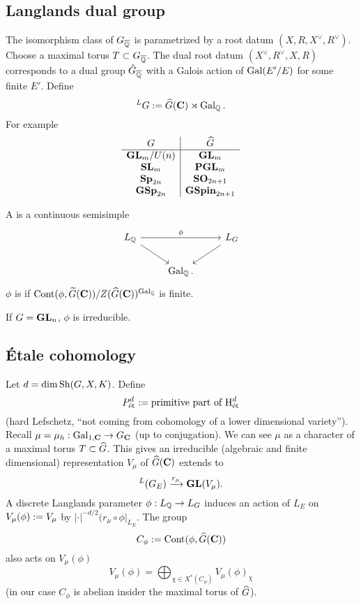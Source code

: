 \subsection{Langlands dual group}
The isomorphism class of $G_{\overline{\mathbb Q}}$ is parametrized by a root datum
$(X,R,X^{\vee},R^{\vee})$. Choose a maximal torus $T\subset G_{\overline{\mathbb Q}}$. The dual
root datum $(X^{\vee},R^{\vee},X,R)$ corresponds to a dual group
$\hat{G}_{\overline{\mathbb Q}}$ with a Galois action of $\operatorname{Gal}(E' /E)$ for some finite $E'$. Define
\[
^{L}G := \widehat{G}(\mathbf{C})\rtimes \operatorname{Gal}_\mathbb Q.
\]
For example
\[
\begin{array}{c|c}
G & \widehat{G} \\ \hline
\mathbf{GL}_m / U(n) & \mathbf{GL}_m \\
\mathbf{SL}_m & \mathbf{PGL}_m \\
\mathbf{Sp}_{2n} & \mathbf{SO}_{2n+1} \\
\mathbf{GSp}_{2n} & \mathbf{GSpin}_{2n+1}
\end{array}
\]
\begin{definition}
A  is a continuous semisimple
\[
\begin{tikzcd}
	L_\Q \ar[rr,"\phi"] \ar[dr] & & L_G \ar[dl] \\
	& \Gal_\Q.
\end{tikzcd}
\]
$\phi$ is  if $\operatorname{Cont}(\phi,\widetilde{G}(\mathbf{C}))
/Z(\widehat{G}(\mathbf{C}))^{\operatorname{Gal}_\mathbb Q}$ is finite.
\end{definition}
If $G=\mathbf{GL}_n$, $\phi$ is irreducible.

\subsection{\'Etale cohomology}
Let $d=\dim \operatorname{Sh}(G,X,K)$. Define
\[
P^{d}_{\text{\'et}} := \text{primitive part of }\mathrm{H}^{d}_{\text{\'et}}
\]
(hard Lefschetz, ``not coming from cohomology of a lower dimensional variety''). Recall
$\mu=\mu_h:\Gal_{1,\C}\to G_{\C}$ (up to conjugation). We can see $\mu$ as a character of
a maximal torus $T\subset \widehat{G}$. This gives an irreducible (algebraic and finite
dimensional) representation $V_\mu$ of $\widehat{G}(\mathbf{C})$ extends to
\[
^{L}(G_E) \xrightarrow{r_\mu} \mathbf{GL}(V_\mu).
\]
A discrete Langlands parameter $\phi:L_\Q\to L_G$ induces an action of $L_E$ on
$V_\mu(\phi):= V_\mu$ by $|\cdot |^{-d /2}(r_{\mu}\circ\phi|_{L_E}$. The group
\[
C_\phi := \operatorname{Cont}(\phi,\widehat{G}(\mathbf{C}))
\]
also acts on $V_\mu(\phi)$
\[
V_\mu(\phi) = \bigoplus_{\chi\in X^{*}(C_\phi)}V_\mu(\phi)_\chi
\]
(in our case $C_\phi$ is abelian insider the maximal torus of $\widehat{G}$).

